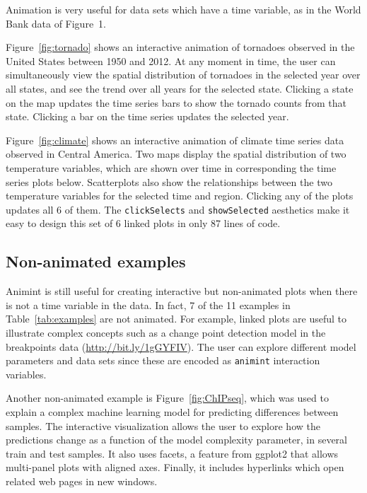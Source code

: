 \documentclass[journal]{vgtc}\usepackage[]{graphicx}\usepackage[]{color}
\begin{document}
Animation is very useful for data sets which have a time variable,
as in the World Bank data of Figure~1.

Figure~\ref{fig:tornado} shows an interactive animation of tornadoes
observed in the United States between 1950 and 2012. At any moment in
time, the user can simultaneously view the spatial distribution of
tornadoes in the selected year over all states, and see the trend over
all years for the selected state. Clicking a state on the map updates the
time series bars to show the tornado counts from that state. Clicking
a bar on the time series updates the selected year.

Figure~\ref{fig:climate} shows an interactive animation of climate
time series data observed in Central America. Two maps display the
spatial distribution of two temperature variables, which are shown
over time in corresponding the time series plots below. Scatterplots
also show the relationships between the two temperature variables for
the selected time and region. Clicking any of the plots updates all 6
of them. The \texttt{clickSelects} and \texttt{showSelected} aesthetics make it easy to
design this set of 6 linked plots in only 87 lines of code.

\subsection{Non-animated examples}

Animint is still useful for creating interactive but
non-animated plots when there is not a time variable in the data.
In fact, 7 of the 11 examples in
Table~\ref{tab:examples} are not animated. For example, linked plots
are useful to illustrate complex concepts such as a change point
detection model in the breakpoints data
(\url{http://bit.ly/1gGYFIV}). The user can explore different model
parameters and data sets since these are encoded as \texttt{animint}
interaction variables.

Another non-animated example is Figure~\ref{fig:ChIPseq}, which was
used to explain a complex machine learning model for predicting
differences between samples. The interactive visualization allows the
user to explore how the predictions change as a function of the model
complexity parameter, in several train and test samples. It also uses
facets, a feature from ggplot2 that allows multi-panel plots with
aligned axes. Finally, it includes hyperlinks which open related web
pages in new windows.
\end{document}
